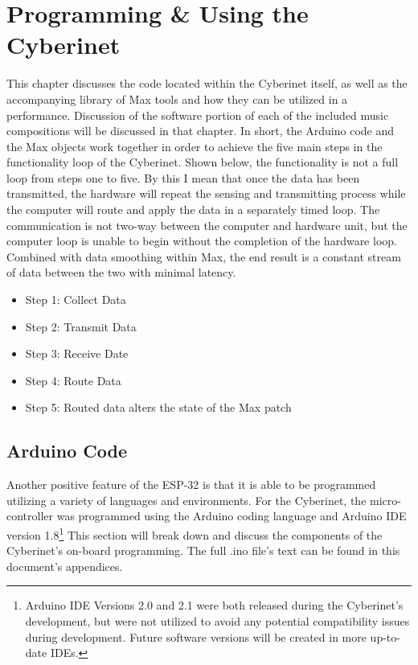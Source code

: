 \chapter{Programming \& Using the Cyberinet}
This chapter discusses the code located within the Cyberinet itself, as well as the accompanying library of Max tools and how they can be utilized in a performance. Discussion of the software portion of each of the included music compositions will be discussed in that chapter. In short, the Arduino code and the Max objects work together in order to achieve the five main steps in the functionality loop of the Cyberinet. Shown below, the functionality is not a full loop from steps one to five. By this I mean that once the data has been transmitted, the hardware will repeat the sensing and transmitting process while the computer will route and apply the data in a separately timed loop. The communication is not two-way between the computer and hardware unit, but the computer loop is unable to begin without the completion of the hardware loop. Combined with data smoothing within Max, the end result is a constant stream of data between the two with minimal latency. %

\begin{itemize}
    \item Step 1: Collect Data
    \item Step 2: Transmit Data
    \item Step 3: Receive Date
    \item Step 4: Route Data
    \item Step 5: Routed data alters the state of the Max patch
\end{itemize}

\section{Arduino Code}
Another positive feature of the ESP-32 is that it is able to be programmed utilizing a variety of languages and environments. For the Cyberinet, the micro-controller was programmed using the Arduino coding language and Arduino IDE version 1.8\footnote{Arduino IDE Versions 2.0 and 2.1 were both released during the Cyberinet's development, but were not utilized to avoid any potential compatibility issues during development. Future software versions will be created in more up-to-date IDEs.} This section will break down and discuss the components of the Cyberinet's on-board programming. The full .ino file's text can be found in this document's appendices.

